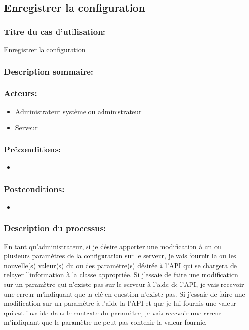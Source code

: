 \documentclass{scrreprt}
\begin{document}
\begin{itemizen}
\subsection{Enregistrer la configuration}
\subsubsection{Titre du cas d'utilisation:} Enregistrer la configuration
\subsubsection{Description sommaire:}
\subsubsection{Acteurs:}
\begin{itemize}
	\item Administrateur système ou administrateur
    \item Serveur
\end{itemize}
\subsubsection{Préconditions:}
\begin{itemize}
    \item  
\end{itemize} 
\subsubsection{Postconditions:}
\begin{itemize}
    \item  
\end{itemize} 
\subsubsection{Description du processus:}En tant qu'administrateur, si je désire apporter une modification à un ou plusieurs
paramètres de la configuration sur le serveur, je vais fournir la ou les nouvelle(s) valeur(s)
du ou des paramètre(s) désirée à l'API qui se chargera de relayer l'information à la classe appropriée.
Si j'essaie de faire une modification sur un paramètre qui n'existe pas sur le
serveur à l'aide de l'API, je vais recevoir une erreur m'indiquant que la clé en
question n'existe pas.
Si j'essaie de faire une modification sur un paramètre à l'aide la l'API et que
je lui fournis une valeur qui est invalide dans le contexte du paramètre, je
vais recevoir une erreur m'indiquant que le paramètre ne peut pas contenir
la valeur fournie.


\end{itemizen}
\end{document}
